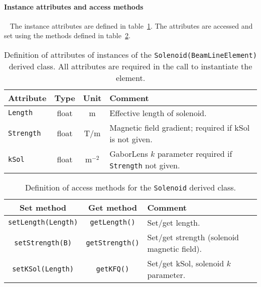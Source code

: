 \paragraph{Instance attributes and access methods} ~\newline
\label{SubSubSect:Slnd:InstAttr}
\noindent
The instance attributes are defined in
table~\ref{Tab:Slnd:Attributes}. 
The attributes are accessed and set using the methods defined in
table~\ref{Tab:Slnd:Methods}.
\begin{table}[h]
  \caption{
    Definition of attributes of instances of
    the \texttt{Solenoid(BeamLineElement)} derived class.
    All attributes are required in the call to instantiate the
    element.
  }
  \label{Tab:Slnd:Attributes}
  \begin{center}
    \begin{tabular}{|l|c|c|p{10cm}|}
      \hline
      \textbf{Attribute}   & \textbf{Type} & \textbf{Unit} & \textbf{Comment}                     \\
      \hline
      \texttt{Length}   & float & m     & Effective length of solenoid.                           \\
      \texttt{Strength} & float & T/m   & Magnetic field gradient; required if kSol is not given. \\
      \texttt{kSol}     & float & m$^{-2}$ & GaborLens $k$ parameter required if \texttt{Strength}
                                          not given.                                              \\
      \hline
    \end{tabular}
  \end{center}
\end{table}
\begin{table}[h]
  \caption{
    Definition of access methods for the \texttt{Solenoid} derived
    class. 
  }
  \label{Tab:Slnd:Methods}
  \begin{center}
    \begin{tabular}{|c|c|p{7cm}|}
      \hline
      \textbf{Set method} & \textbf{Get method}  & \textbf{Comment}                                  \\
      \hline
      \texttt{setLength(Length)}   & \texttt{getLength()}   & Set/get length.                        \\
      \texttt{setStrength(B)}      & \texttt{getStrength()} & Set/get strength (solenoid magnetic
                                                              field).                                \\
      \texttt{setKSol(Length)}     & \texttt{getKFQ()}      & Set/get kSol, solenoid $k$ parameter.  \\
      \hline
    \end{tabular}
  \end{center}
\end{table}

